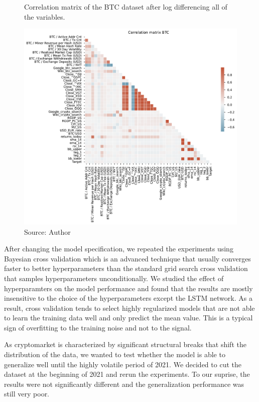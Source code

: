 \begin{figure}[!h]
    \centering
    \caption{Correlation matrix of the BTC dataset after
    log differencing all of the variables.}
    \includegraphics[width=1\textwidth]{Figures/Corr_btc_logdiff.pdf}
    \caption*{Source: Author}
    \label{fig:Corr_btc_logdiff}
\end{figure}

After changing the model specification, we repeated the experiments
using Bayesian cross validation which is 
an advanced technique that 
usually converges faster to better hyperparameters than the standard
grid search cross validation that samples hyperparameters unconditionally. 
We studied the effect of hyperparamters on the model performance
and found that the results are mostly insensitive to the choice of the
hyperparameters except the \ac{LSTM} network. As a result, cross validation tends to 
select highly regularized models that 
are not able to learn the training data well and only predict the mean value.
This is a typical sign of overfitting to the training noise and
not to the signal. 


As cryptomarket is characterized by significant structural breaks
that shift the distribution of the data, we wanted
to test whether the model is able to generalize well
until the highly volatile period of 2021. We decided to cut 
the dataset at the beginning of 2021 and rerun the experiments.
To our suprise, the results were not significantly different and the 
generalization performance was still very poor.


